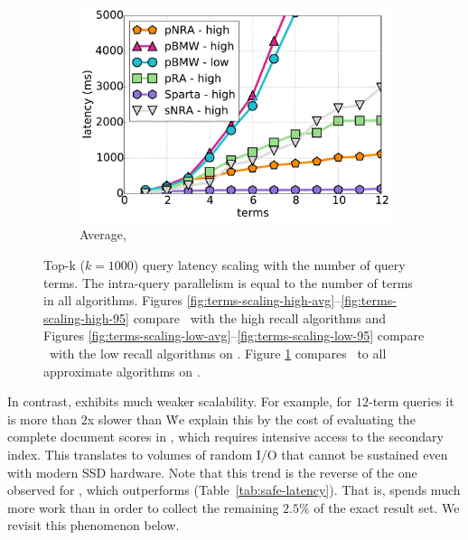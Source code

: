 {{\begin{figure}[tbh]
    \begin{subfigure}[t]{0.4\textwidth}
    \includegraphics[width=\textwidth]{figures/latency_12threads_cluewebX10.pdf}
	\caption{Average, \cwten}
	        \label{fig:terms-scaling-10x-avg}
    \end{subfigure}  

\caption{Top-k ($k=1000$) query latency scaling with the number of query terms. 
The intra-query parallelism is equal to the number of terms in all algorithms. Figures \ref{fig:terms-scaling-high-avg}--\ref{fig:terms-scaling-high-95} compare \alg\hi\ with the high recall algorithms and Figures \ref{fig:terms-scaling-low-avg}--\ref{fig:terms-scaling-low-95} compare \alg\hi\ with the low recall algorithms on \cw. 
Figure \ref{fig:terms-scaling-10x-avg} compares  \alg\hi\ to all approximate algorithms on \cwten. }
\label{fig:terms-scaling}
\end{figure}

%

In contrast, \pRA\/ exhibits much weaker scalability. For example, for $12$-term queries it is more than $2$x slower than \alg\. 
We explain this by the cost of evaluating the complete 
document scores in \pRA, which requires intensive access to the secondary index. This translates to volumes of random 
I/O that cannot be sustained even with modern SSD hardware. Note that this trend is the reverse of the one observed for \pRA\ex, 
which outperforms \alg\ex\/ (Table~\ref{tab:safe-latency}). That is, \alg\/ spends much more work than \pRA\/ 
in order to collect the remaining $2.5\%$ of the exact result set. We revisit this phenomenon  below. 


}}

